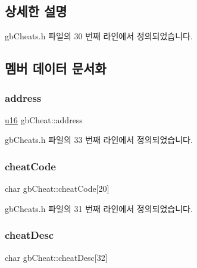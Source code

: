 \subsection{상세한 설명}


gb\+Cheats.\+h 파일의 30 번째 라인에서 정의되었습니다.



\subsection{멤버 데이터 문서화}
\mbox{\label{structgb_cheat_a9cd0d16b2f8cfad6408130d037181559}} 
\subsubsection{\texorpdfstring{address}{address}}
{\footnotesize\ttfamily \mbox{\hyperlink{_system_8h_a9e6c91d77e24643b888dbd1a1a590054}{u16}} gb\+Cheat\+::address}



gb\+Cheats.\+h 파일의 33 번째 라인에서 정의되었습니다.

\mbox{\label{structgb_cheat_ae91f81b3b07bd842606880b4fb1a74a8}} 
\subsubsection{\texorpdfstring{cheat\+Code}{cheatCode}}
{\footnotesize\ttfamily char gb\+Cheat\+::cheat\+Code\mbox{[}20\mbox{]}}



gb\+Cheats.\+h 파일의 31 번째 라인에서 정의되었습니다.

\mbox{\label{structgb_cheat_aeddcedaba8d5c8f0a9c6eb4903a321fa}} 
\subsubsection{\texorpdfstring{cheat\+Desc}{cheatDesc}}
{\footnotesize\ttfamily char gb\+Cheat\+::cheat\+Desc\mbox{[}32\mbox{]}}



